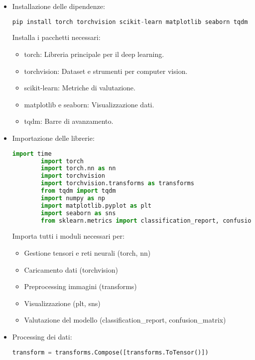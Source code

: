 \documentclass[a4paper,12pt]{article}
\begin{document}
\begin{itemize}
    \item Installazione delle dipendenze:
    \begin{lstlisting}[language=Python, basicstyle=\ttfamily\footnotesize, breaklines=true, frame=single]
        pip install torch torchvision scikit-learn matplotlib seaborn tqdm
    \end{lstlisting}
    Installa i pacchetti necessari:
    \begin{itemize}
        \item torch: Libreria principale per il deep learning.
        \item torchvision: Dataset e strumenti per computer vision.
        \item scikit-learn: Metriche di valutazione.
        \item matplotlib e seaborn: Visualizzazione dati.
        \item tqdm: Barre di avanzamento.
    \end{itemize}
    \item Importazione delle librerie:
    \begin{lstlisting}[language=Python, basicstyle=\ttfamily\footnotesize, breaklines=true, frame=single]
        import time 
        import torch 
        import torch.nn as nn 
        import torchvision 
        import torchvision.transforms as transforms
        from tqdm import tqdm
        import numpy as np 
        import matplotlib.pyplot as plt 
        import seaborn as sns 
        from sklearn.metrics import classification_report, confusion_matrix 
    \end{lstlisting}
    Importa tutti i moduli necessari per:
    \begin{itemize}
        \item Gestione tensori e reti neurali (torch, nn)
        \item Caricamento dati (torchvision)
        \item Preprocessing immagini (transforms)
        \item Visualizzazione (plt, sns)
        \item Valutazione del modello (classification\_report, confusion\_matrix)
    \end{itemize}
    \item Processing dei dati:
    \begin{lstlisting}[language=Python, basicstyle=\ttfamily\footnotesize, breaklines=true, frame=single]
        transform = transforms.Compose([transforms.ToTensor()])

\end{lstlisting}
\end{itemize}
\end{document}
